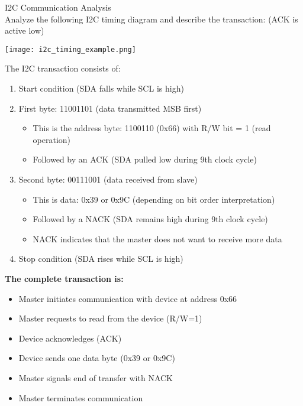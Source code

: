 \begin{example2}{I2C Communication Analysis}\\
Analyze the following I2C timing diagram and describe the transaction: (ACK is active low)

\texttt{[image: i2c\_timing\_example.png]}

\tcblower
The I2C transaction consists of:
\begin{enumerate}
    \item Start condition (SDA falls while SCL is high)
    \item First byte: 11001101 (data transmitted MSB first)
    \begin{itemize}
        \item This is the address byte: 1100110 (0x66) with R/W bit = 1 (read operation)
        \item Followed by an ACK (SDA pulled low during 9th clock cycle)
    \end{itemize}
    \item Second byte: 00111001 (data received from slave)
    \begin{itemize}
        \item This is data: 0x39 or 0x9C (depending on bit order interpretation)
        \item Followed by a NACK (SDA remains high during 9th clock cycle)
        \item NACK indicates that the master does not want to receive more data
    \end{itemize}
    \item Stop condition (SDA rises while SCL is high)
\end{enumerate}
\vspace{1mm}
\textbf{The complete transaction is:}
\begin{itemize}
    \item Master initiates communication with device at address 0x66
    \item Master requests to read from the device (R/W=1)
    \item Device acknowledges (ACK)
    \item Device sends one data byte (0x39 or 0x9C)
    \item Master signals end of transfer with NACK
    \item Master terminates communication
\end{itemize}
\end{example2}


\raggedcolumns
\pagebreak

